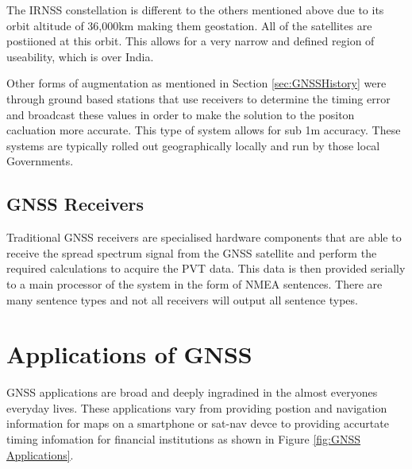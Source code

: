 The IRNSS constellation is different to the others mentioned above due to its orbit altitude of 36,000km making them geostation. All of the satellites are postiioned at
this orbit. This allows for a very narrow and defined region of useability, which is over India. 

Other forms of augmentation as mentioned in Section \ref{sec:GNSSHistory} were through ground based stations that use receivers to determine the timing error and broadcast these
values in order to make the solution to the positon cacluation more accurate. This type of system allows for sub 1m accuracy. These systems are typically rolled out
geographically locally and run by those local Governments.

\subsection{GNSS Receivers}
Traditional GNSS receivers are specialised hardware components that are able to receive the spread spectrum signal from the GNSS satellite and perform the required
calculations to acquire the PVT data. This data is then provided serially to a main processor of the system in the form of NMEA sentences. There are many sentence types
and not all receivers will output all sentence types. 


\section{Applications of GNSS} \label{sec:ApplicationsGNSS}
GNSS applications are broad and deeply ingradined in the almost everyones everyday lives. These applications vary from providing postion and navigation information for
maps on a smartphone or sat-nav devce to providing accurtate timing infomation for financial institutions \cite{RN33} as shown in Figure \ref{fig:GNSS Applications}.

